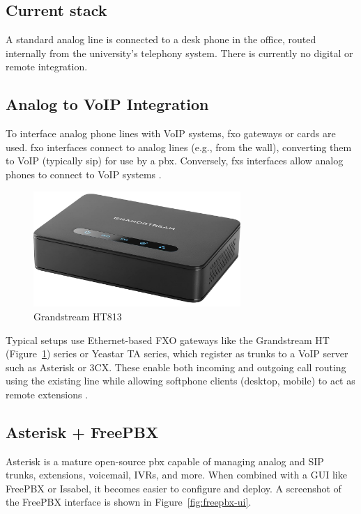 \subsection*{Current stack}

A standard analog line is connected to a desk phone in the office, routed internally from the university's telephony system. There is currently no digital or remote integration.

\subsection*{Analog to VoIP Integration}

To interface analog phone lines with VoIP systems, \gls{fxo} gateways or cards are used. \gls{fxo} interfaces connect to analog lines (e.g., from the wall), converting them to VoIP (typically \gls{sip}) for use by a \gls{pbx}. Conversely, \gls{fxs} interfaces allow analog phones to connect to VoIP systems \cite{YeastarFXOvFSX2024,3CX_FXSFXO}.

\begin{figure}[H]
  \centering
  \includegraphics[width=0.7\textwidth]{imaxes/grandstream-ht.png}
  \caption{Grandstream HT813}
  \label{fig:grandstream-ht}
\end{figure}

Typical setups use Ethernet-based FXO gateways like the Grandstream HT (Figure~\ref{fig:grandstream-ht}) series or Yeastar TA series, which register as trunks to a VoIP server such as Asterisk or 3CX. These enable both incoming and outgoing call routing using the existing line while allowing softphone clients (desktop, mobile) to act as remote extensions \cite{YeastarFXOvFSX2024,AsteriskCommunity2024}.

\subsection*{Asterisk + FreePBX}

Asterisk is a mature open-source \gls{pbx} capable of managing analog and SIP trunks, extensions, voicemail, IVRs, and more. When combined with a GUI like FreePBX or Issabel, it becomes easier to configure and deploy. A screenshot of the FreePBX interface is shown in Figure~\ref{fig:freepbx-ui}.

